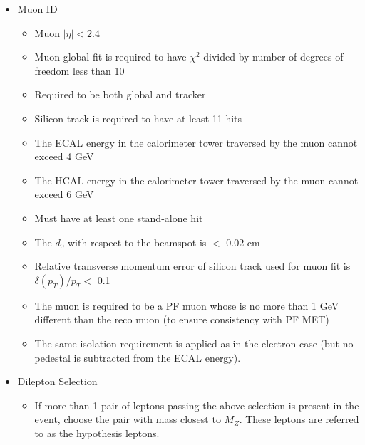 \begin{itemize}
\item Muon ID
  \begin{itemize}
  \item Muon $|\eta| < 2.4$
  \item Muon global fit is required to have $\chi^2$ divided by number of degrees of freedom less than 10
  \item Required to be both global and tracker
  \item Silicon track is required to have at least 11 hits
  \item The ECAL energy in the calorimeter tower traversed by the muon cannot exceed 4 GeV
  \item The HCAL energy in the calorimeter tower traversed by the muon cannot exceed 6 GeV
  \item Must have at least one stand-alone hit
  \item The $d_0$ with respect to the beamspot is $<$ 0.02 cm
  \item Relative transverse momentum error of silicon track used for muon fit is  $\delta(p_{T})/p_{T} < $ 0.1
  \item The muon is required to be a PF muon whose \pt is no more than 1 GeV different than the reco muon (to ensure consistency with PF MET)
  \item The same isolation requirement is applied as in the electron case (but no pedestal is subtracted from the ECAL energy).
  \end{itemize}
\item Dilepton Selection
  \begin{itemize}
  \item If more than 1 pair of leptons passing the above selection is present in the event, choose the
    pair with mass closest to $M_{Z}$. These leptons are referred to as the \Z hypothesis leptons.
  \end{itemize}


\end{itemize}


